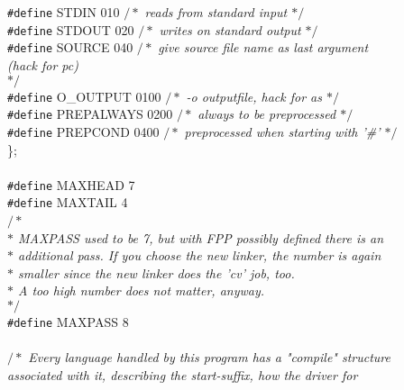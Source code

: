 \begin{flushleft}
{\tt \#define} STDIN  010      {$/\ast$\it{} reads from standard input $\ast/$}\mbox{}\\
{\tt \#define} STDOUT 020      {$/\ast$\it{} writes on standard output $\ast/$}\mbox{}\\
{\tt \#define} SOURCE 040      {$/\ast$\it{} give source file name as last argument\mbox{}\\
\hspace*{15\indentation}(hack for pc)\mbox{}\\
\hspace*{12\indentation}$\ast/$}\mbox{}\\
{\tt \#define} O\_OUTPUT 0100      {$/\ast$\it{} -o outputfile, hack for as $\ast/$}\mbox{}\\
{\tt \#define} PREPALWAYS   0200  {$/\ast$\it{} always to be preprocessed $\ast/$}\mbox{}\\
{\tt \#define} PREPCOND  0400  {$/\ast$\it{} preprocessed when starting with '\#' $\ast/$}\mbox{}\\
\};\mbox{}\\
\mbox{}\\
{\tt \#define} MAXHEAD   7\mbox{}\\
{\tt \#define} MAXTAIL   4\mbox{}\\
{$/\ast$\it{}\mbox{}\\
\hspace*{1\indentation}$\ast$ MAXPASS used to be 7, but with FPP possibly defined there is an\mbox{}\\
\hspace*{1\indentation}$\ast$ additional pass. If you choose the new linker, the number is again\mbox{}\\
\hspace*{1\indentation}$\ast$ smaller since the new linker does the 'cv' job, too.\mbox{}\\
\hspace*{1\indentation}$\ast$ A too high number does not matter, anyway.\mbox{}\\
\hspace*{1\indentation}$\ast/$}\mbox{}\\
{\tt \#define} MAXPASS   8\mbox{}\\
\mbox{}\\
{$/\ast$\it{} Every language handled by this program has a "compile" structure\mbox{}\\
\hspace*{3\indentation}associated with it, describing the start-suffix, how the driver for\mbox{}\\
}
\end{flushleft}
